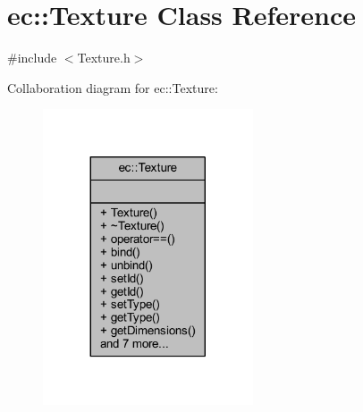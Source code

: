 \hypertarget{classec_1_1_texture}{}\section{ec\+:\+:Texture Class Reference}
\label{classec_1_1_texture}


{\ttfamily \#include $<$Texture.\+h$>$}



Collaboration diagram for ec\+:\+:Texture\+:\nopagebreak
\begin{figure}[H]
\begin{center}
\leavevmode
\includegraphics[width=176pt]{classec_1_1_texture__coll__graph}
\end{center}
\end{figure}
